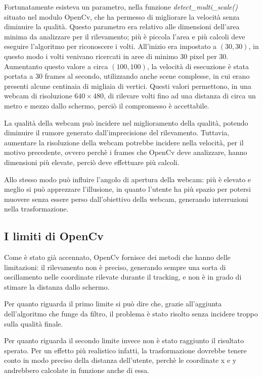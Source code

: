Fortunatamente esisteva un parametro, nella funzione \textit{detect\_multi\_scale()} situato nel modulo OpenCv, che ha permesso di migliorare la velocità senza diminuire la qualità. Questo parametro era relativo alle dimensioni dell'area minima da analizzare per il rilevamento; più è piccola l'area e più calcoli deve eseguire l'algoritmo per riconoscere i volti. All'inizio era impostato a $(30,30)$, in questo modo i volti venivano ricercati in aree di minimo 30 pixel per 30. Aumentanto questo valore a circa $(100,100)$, la velocità di esecuzione è stata portata a 30 frames al secondo, utilizzando anche scene complesse, in cui erano presenti alcune centinaia di migliaia di vertici. Questi valori permettono, in una webcam di risoluzione $640\times480$, di rilevare volti fino ad una distanza di circa un metro e mezzo dallo schermo, perciò il compromesso è accettabile.

La qualità della webcam può incidere nel miglioramento della qualità, potendo diminuire il rumore generato dall'imprecisione del rilevamento. Tuttavia, aumentare la risoluzione della webcam potrebbe incidere nella velocità, per il motivo precedente, ovvero perchè i frames che OpenCv deve analizzare, hanno dimensioni più elevate, perciò deve effettuare più calcoli.

Allo stesso modo può influire l'angolo di apertura della webcam: più è elevato e meglio si può apprezzare l'illusione, in quanto l'utente ha più spazio per potersi muovere senza essere perso dall'obiettivo della webcam, generando interruzioni nella trasformazione. 

\subsection{I limiti di OpenCv}

Come è stato già accennato, OpenCv fornisce dei metodi che hanno delle limitazioni: il rilevamento non è preciso, generando sempre una sorta di oscillamento nelle coordinate rilevate durante il tracking, e non è in grado di stimare la distanza dallo schermo.

Per quanto riguarda il primo limite si può dire che, grazie all'aggiunta dell'algoritmo che funge da filtro, il problema è stato risolto senza incidere troppo sulla qualità finale.

Per quanto riguarda il secondo limite invece non è stato raggiunto il risultato sperato. Per un effetto più realistico infatti, la trasformazione dovrebbe tenere conto in modo preciso della distanza dell'utente, perchè le coordinate x e y andrebbero calcolate in funzione anche di essa.

